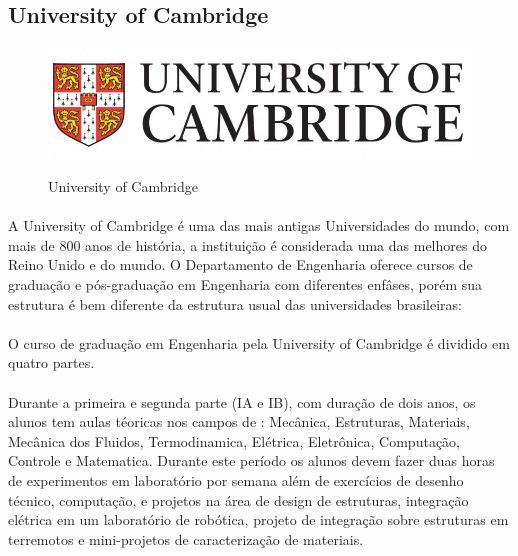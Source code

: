 \documentclass[12pt]{article} %
\begin{document}
\subsection{University of Cambridge}

\begin{figure}[H]
\centering
\includegraphics[scale=0.3]{pictures/logoCambridge.jpg}\\
\caption{University of Cambridge}
\end{figure}

\paragraph{} A University of Cambridge é uma das mais antigas Universidades do mundo, com mais de 800 anos de história, a instituição é considerada uma das melhores do Reino Unido e do mundo. O Departamento de Engenharia oferece cursos de graduação e pós-graduação em Engenharia com diferentes enfâses, porém sua estrutura é bem diferente da estrutura usual das universidades brasileiras:

\paragraph{} O curso de graduação em Engenharia pela University of Cambridge é dividido em quatro partes.

\paragraph{} Durante a primeira e segunda parte (IA e IB), com duração de dois anos, os alunos tem aulas téoricas nos campos de : Mecânica, Estruturas, Materiais, Mecânica dos Fluidos, Termodinamica, Elétrica, Eletrônica, Computação, Controle e Matematica. Durante este período os alunos devem fazer duas horas de experimentos em laboratório por semana além de exercícios de desenho técnico, computação, e projetos na área de design de estruturas, integração elétrica em um laboratório de robótica, projeto de integração sobre estruturas em terremotos e mini-projetos de caracterização de materiais.
\end{document}
